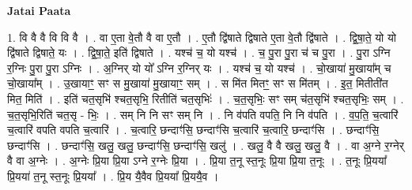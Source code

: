 \documentclass[17pt]{extarticle}
\begin{document}
\textbf{Jatai Paata} \newline

1. वि वै वै वि वि वै । . वा ए॒ता वे॒तौ वै वा ए॒तौ । . ए॒तौ द्वि॑षाते द्विषाते ए॒ता वे॒तौ द्वि॑षाते । . द्वि॒षा॒ते॒ यो यो द्वि॑षाते द्विषाते॒ यः । . द्वि॒षा॒ते॒ इति॑ द्विषाते । . यश्च॑ च॒ यो यश्च॑ । . च॒ पु॒रा पु॒रा च॑ च पु॒रा । . पु॒रा ऽग्नि र॒ग्निः पु॒रा पु॒रा ऽग्निः । . अ॒ग्निर् यो यो᳚ ऽग्नि र॒ग्निर् यः । . यश्च॑ च॒ यो यश्च॑ । . चो॒खाया॑ मु॒खाया᳚म् च चो॒खाया᳚म् । . उ॒खायाꣳ॒॒ सꣳ स मु॒खाया॑ मु॒खायाꣳ॒॒ सम् । . स मि॑त मितꣳ॒॒ सꣳ स मि॑तम् । . इ॒त॒ मितीती॑त मित॒ मिति॑ । . इति॑ चत॒सृभि॑ श्चत॒सृभि॒ रितीति॑ चत॒सृभिः॑ । . च॒त॒सृभिः॒ सꣳ सम् च॑त॒सृभि॑ श्चत॒सृभिः॒ सम् । . च॒त॒सृभि॒रिति॑ चत॒सृ - भिः॒ । . सम् नि नि सꣳ सम् नि । . नि व॑पति वपति॒ नि नि व॑पति । . व॒प॒ति॒ च॒त्वारि॑ च॒त्वारि॑ वपति वपति च॒त्वारि॑ । . च॒त्वारि॒ छन्दाꣳ॑सि॒ छन्दाꣳ॑सि च॒त्वारि॑ च॒त्वारि॒ छन्दाꣳ॑सि । . छन्दाꣳ॑सि॒ छन्दाꣳ॑सि । . छन्दाꣳ॑सि॒ खलु॒ खलु॒ छन्दाꣳ॑सि॒ छन्दाꣳ॑सि॒ खलु॑ । . खलु॒ वै वै खलु॒ खलु॒ वै । . वा अ॒ग्ने र॒ग्नेर् वै वा अ॒ग्नेः । . अ॒ग्नेः प्रि॒या प्रि॒या ऽग्ने र॒ग्नेः प्रि॒या । . प्रि॒या त॒नू स्त॒नूः प्रि॒या प्रि॒या त॒नूः । . त॒नूः प्रि॒यया᳚ प्रि॒यया॑ त॒नू स्त॒नूः प्रि॒यया᳚ । . प्रि॒य यै॒वैव प्रि॒यया᳚ प्रि॒ययै॒व । \newline
\end{document}
